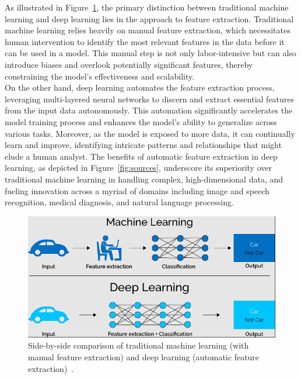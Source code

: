 As illustrated in Figure~\ref{fig:trad_and_deep}, the primary distinction between traditional machine learning and deep learning lies in the approach to feature extraction. Traditional machine learning relies heavily on manual feature extraction, which necessitates human intervention to identify the most relevant features in the data before it can be used in a model. This manual step is not only labor-intensive but can also introduce biases and overlook potentially significant features, thereby constraining the model's effectiveness and scalability.\\

On the other hand, deep learning automates the feature extraction process, leveraging multi-layered neural networks to discern and extract essential features from the input data autonomously. This automation significantly accelerates the model training process and enhances the model's ability to generalize across various tasks. Moreover, as the model is exposed to more data, it can continually learn and improve, identifying intricate patterns and relationships that might elude a human analyst. The benefits of automatic feature extraction in deep learning, as depicted in Figure~\ref{fig:sources}, underscore its superiority over traditional machine learning in handling complex, high-dimensional data, and fueling innovation across a myriad of domains including image and speech recognition, medical diagnosis, and natural language processing.
\\

\begin{figure}[htbp]
    \centerline{\includegraphics[scale=.75]{figures/traditional_vs_deeplearning.png}}
    \caption{Side-by-side comparison of traditional machine learning (with manual feature extraction) and deep learning (automatic feature extraction)~\cite{mahapatra2018deep}.}
    \label{fig:trad_and_deep}
    \end{figure}


